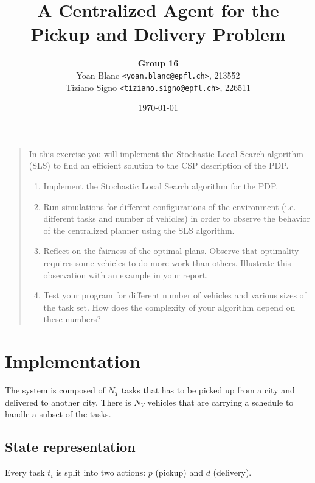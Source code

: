 \documentclass[11pt,a4paper]{article}
\title{\phantomsection%
    A Centralized Agent for the Pickup and Delivery Problem
}
\author{
    \textbf{Group 16}\\
    Yoan Blanc \texttt{<yoan.blanc@epfl.ch>}, 213552\\
    Tiziano Signo \texttt{<tiziano.signo@epfl.ch>}, 226511
}
\date{\today}
\begin{document}
\maketitle

\noindent
\begin{quote}{\it

    In this exercise you will implement the Stochastic Local Search algorithm
    (SLS) to find an efficient solution to the CSP description of the PDP.

    \begin{enumerate}
        \item Implement the Stochastic Local Search algorithm for the PDP.

        \item Run simulations for different configurations of the environment
        (i.e. different tasks and number of vehicles) in order to observe the
        behavior of the centralized planner using the SLS algorithm.

        \item Reflect on the fairness of the optimal plans. Observe that
        optimality requires some vehicles to do more work than others.
        Illustrate this observation with an example in your report.

        \item Test your program for different number of vehicles and various
        sizes of the task set. How does the complexity of your algorithm depend
        on these numbers?

    \end{enumerate}

}\end{quote}

\newpage
\section*{Implementation}

The system is composed of $N_T$ tasks that has to be picked up from a city
and delivered to another city. There is $N_V$ vehicles that are carrying a
schedule to handle a subset of the tasks.

\subsection*{State representation}

Every task $t_i$ is split into two actions: $p$ (pickup) and $d$ (delivery).
\end{document}
